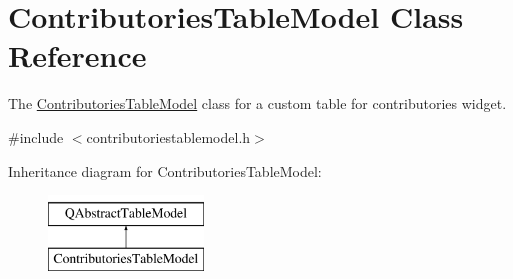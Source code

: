 \hypertarget{classContributoriesTableModel}{\section{Contributories\+Table\+Model Class Reference}
\label{classContributoriesTableModel}
}


The \hyperlink{classContributoriesTableModel}{Contributories\+Table\+Model} class for a custom table for contributories widget.  




{\ttfamily \#include $<$contributoriestablemodel.\+h$>$}

Inheritance diagram for Contributories\+Table\+Model\+:\begin{figure}[H]
\begin{center}
\leavevmode
\includegraphics[height=2.000000cm]{d4/d24/classContributoriesTableModel}
\end{center}
\end{figure}
